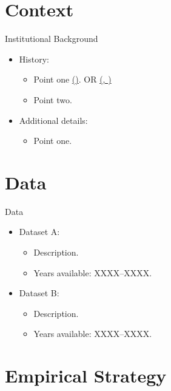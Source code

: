 \documentclass[notes=hide,subsection=false]{beamer}
\renewcommand{\citet}[2][]{%
  \textcolor{blue}{\hyperlink{cite.#2}{\citeauthor{#2}\thinspace(\citeyear{#2}\ifblank{#1}{}{, #1})}}}
\renewcommand{\citep}[2][]{%
  \textcolor{blue}{\hyperlink{cite.#2}{(\citeauthor{#2}, \citeyear{#2}\ifblank{#1}{}{, #1})}}}
\begin{document}
\section{Context}

\begin{frame}{Institutional Background}
    \begin{itemize}
        \item<+-> History:
        \begin{itemize}
            \item Point one \citet{barro1971general}. OR \citep{card1992using}
            \item Point two.
        \end{itemize}
        \item<+-> Additional details:
        \begin{itemize}
            \item Point one.
        \end{itemize}
    \end{itemize}
\end{frame}

\section{Data}

\begin{frame}{Data}
    \begin{itemize}
        \item<+-> Dataset A:
        \begin{itemize}
            \item Description.
            \item Years available: XXXX--XXXX.
        \end{itemize}
        \item<+-> Dataset B:
        \begin{itemize}
            \item Description.
            \item Years available: XXXX--XXXX.
        \end{itemize}
    \end{itemize}
\end{frame}

\section{Empirical Strategy}
\end{document}
